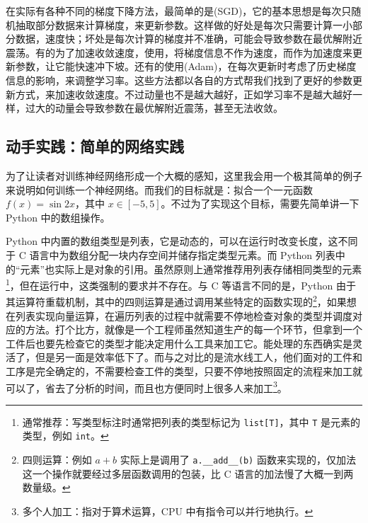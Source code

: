在实际有各种不同的梯度下降方法，最简单的是(SGD)，它的基本思想是每次只随机抽取部分数据来计算梯度，来更新参数。这样做的好处是每次只需要计算一小部分数据，速度快；坏处是每次计算的梯度并不准确，可能会导致参数在最优解附近震荡。有的为了加速收敛速度，使用，将梯度信息不作为速度，而作为加速度来更新参数，让它能快速冲下坡。还有的使用(Adam)，在每次更新时考虑了历史梯度信息的影响，来调整学习率。这些方法都以各自的方式帮我们找到了更好的参数更新方式，来加速收敛速度。不过动量也不是越大越好，正如学习率不是越大越好一样，过大的动量会导致参数在最优解附近震荡，甚至无法收敛。

\newpage

\subsection*{动手实践：简单的网络实践}

为了让读者对训练神经网络形成一个大概的感知，这里我会用一个极其简单的例子来说明如何训练一个神经网络。而我们的目标就是：拟合一个一元函数 $f(x) = \sin 2x$，其中 $x \in [-5, 5]$。不过为了实现这个目标，需要先简单讲一下 Python 中的数组操作。

Python 中内置的数组类型是列表，它是动态的，可以在运行时改变长度，这不同于 C 语言中为数组分配一块内存空间并储存指定类型元素。而 Python 列表中的“元素”也实际上是对象的引用。虽然原则上通常推荐用列表存储相同类型的元素\footnote{通常推荐：写类型标注时通常把列表的类型标记为 \texttt{list[T]}，其中 \texttt{T} 是元素的类型，例如 \texttt{int}。}，但在运行中，这类强制的要求并不存在。与 C 等语言不同的是，Python 由于其运算符重载机制，其中的四则运算是通过调用某些特定的函数实现的\footnote{四则运算：例如 $a + b$ 实际上是调用了 \texttt{a.\_\_add\_\_(b)} 函数来实现的，仅加法这一个操作就要经过多层函数调用的包装，比 C 语言的加法慢了大概一到两数量级。}，如果想在列表实现向量运算，在遍历列表的过程中就需要不停地检查对象的类型并调度对应的方法。打个比方，就像是一个工程师虽然知道生产的每一个环节，但拿到一个工件后也要先检查它的类型才能决定用什么工具来加工它。能处理的东西确实是灵活了，但是另一面是效率低下了。而与之对比的是流水线工人，他们面对的工件和工序是完全确定的，不需要检查工件的类型，只要不停地按照固定的流程来加工就可以了，省去了分析的时间，而且也方便同时上很多人来加工\footnote{多个人加工：指对于算术运算，CPU 中有指令可以并行地执行。}。

